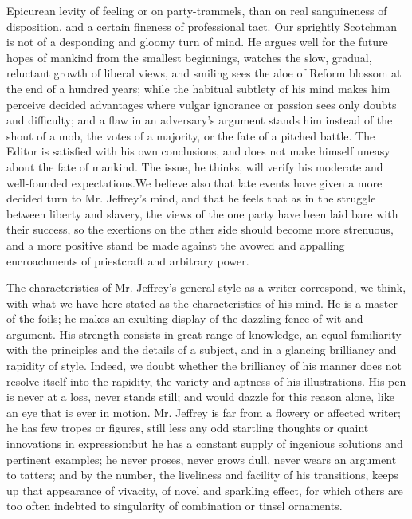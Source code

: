 Epicurean levity of feeling or on party-trammels, than on real
sanguineness of disposition, and a certain fineness of
professional tact. Our sprightly Scotchman is not of a desponding
and gloomy turn of mind. He argues well for the future hopes of
mankind from the smallest beginnings, watches the slow, gradual,
reluctant growth of liberal views, and smiling sees the aloe of
Reform blossom at the end of a hundred years; while the habitual
subtlety of his mind makes him perceive decided advantages where
vulgar ignorance or passion sees only doubts and difficulty; and a
flaw in an adversary's argument stands him instead of the shout of
a mob, the votes of a majority, or the fate of a pitched
battle. The Editor is satisfied with his own conclusions, and does
not make himself uneasy about the fate of mankind. The issue, he
thinks, will verify his moderate and well-founded
expectations.\textemdash We believe also that late events have
given a more decided turn to Mr.  Jeffrey's mind, and that he
feels that as in the struggle between liberty and slavery, the
views of the one party have been laid bare with their success, so
the exertions on the other side should become more strenuous, and
a more positive stand be made against the avowed and appalling
encroachments of priestcraft and arbitrary power.

The characteristics of Mr. Jeffrey's general style as a writer
correspond, we think, with what we have here stated as the
characteristics of his mind. He is a master of the foils; he makes
an exulting display of the dazzling fence of wit and argument. His
strength consists in great range of knowledge, an equal
familiarity with the principles and the details of a subject, and
in a glancing brilliancy and rapidity of style. Indeed, we doubt
whether the brilliancy of his manner does not resolve itself into
the rapidity, the variety and aptness of his illustrations. His
pen is never at a loss, never stands still; and would dazzle for
this reason alone, like an eye that is ever in motion. Mr. Jeffrey
is far from a flowery or affected writer; he has few tropes or
figures, still less any odd startling thoughts or quaint
innovations in expression:\textemdash but he has a constant supply
of ingenious solutions and pertinent examples; he never proses,
never grows dull, never wears an argument to tatters; and by the
number, the liveliness and facility of his transitions, keeps up
that appearance of vivacity, of novel and sparkling effect, for
which others are too often indebted to singularity of combination
or tinsel ornaments.

